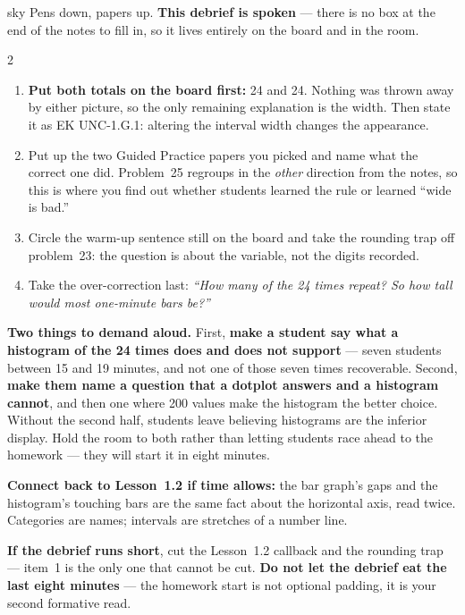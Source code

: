 \documentclass[10pt]{article}
\begin{document}
\boxguard
\begin{skillbox}{sky}
Pens down, papers up. \textbf{This debrief is spoken} --- there is no box at the end of the
notes to fill in, so it lives entirely on the board and in the room.
\begin{multicols}{2}
\begin{enumerate}[leftmargin=1.3em, nosep, itemsep=3pt]
  \item \textbf{Put both totals on the board first:} 24 and 24. Nothing was thrown away by
        either picture, so the only remaining explanation is the width. Then state it as
        EK UNC-1.G.1: altering the interval width changes the appearance.
  \item Put up the two Guided Practice papers you picked and name what the correct one
        did. Problem~25 regroups in the \emph{other} direction from the notes, so this is where
        you find out whether students learned the rule or learned ``wide is bad.''
  \item Circle the warm-up sentence still on the board and take the rounding trap off problem~23:
        the question is about the variable, not the digits recorded.
  \item Take the over-correction last: \emph{``How many of the 24 times repeat? So how tall
        would most one-minute bars be?''}
\end{enumerate}
\columnbreak
\textbf{Two things to demand aloud.} First, \textbf{make a student say what a histogram of the
24 times does and does not support} --- seven students between 15 and 19 minutes, and not one of
those seven times recoverable. Second, \textbf{make them name a question that a dotplot answers
and a histogram cannot}, and then one where 200 values make the histogram the better choice.
Without the second half, students leave believing histograms are the inferior display. Hold the
room to both rather than letting students race ahead to the homework --- they will start it in
eight minutes.

\textbf{Connect back to Lesson~1.2 if time allows:} the bar graph's gaps and the histogram's
touching bars are the same fact about the horizontal axis, read twice. Categories are names;
intervals are stretches of a number line.

\textbf{If the debrief runs short}, cut the Lesson~1.2 callback and the rounding trap --- item~1
is the only one that cannot be cut. \textbf{Do not let the debrief eat the last eight minutes}
--- the homework start is not optional padding, it is your second formative read.
\end{multicols}
\end{skillbox}
\end{document}
